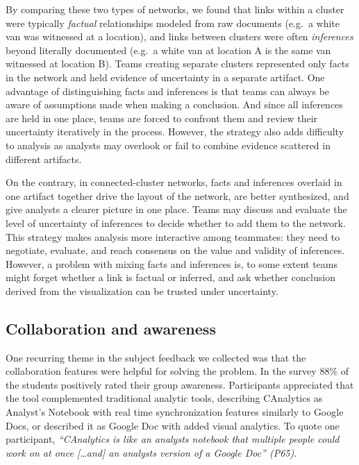 By comparing these two types of networks, we found that links within a cluster were typically
\emph{factual} relationships modeled from raw documents (e.g.~a white van was
witnessed at a location), and links between clusters were often
\emph{inferences} beyond literally documented (e.g.~a white van at location A
is the same van witnessed at location B). Teams creating separate
clusters represented only facts in the network and held evidence of
uncertainty in a separate artifact. One advantage of distinguishing
facts and inferences is that teams can always be aware of assumptions made when
making a conclusion. And since all inferences are held in one place,
teams are forced to confront them and review their uncertainty
iteratively in the process. However, the strategy also adds difficulty
to analysis as analysts may overlook or fail to combine evidence
scattered in different artifacts.




On the contrary, in connected-cluster networks, facts and inferences overlaid in one artifact together drive the layout of the
network, are better synthesized, and give analysts a clearer picture in one place. Teams may discuss and evaluate the level of uncertainty of inferences to decide whether to add them to the
network. This strategy makes analysis more interactive among teammates:
they need to negotiate, evaluate, and reach consensus on the value and
validity of inferences. However, a problem with mixing facts and inferences is, to some extent teams might forget whether a
link is factual or inferred, and ask whether conclusion derived
from the visualization can be trusted under uncertainty.

\subsection{Collaboration and
awareness}\label{collaboration-and-awareness}


One recurring theme in the subject feedback we collected was that the
collaboration features were helpful for solving the problem. In the survey 
88\% of the students positively rated their
group awareness. Participants appreciated that the tool complemented
traditional analytic tools, describing CAnalytics as Analyst's Notebook with real time
synchronization features similarly to Google Docs, or described it as Google Doc with added visual analytics. To quote one participant,
\emph{``CAnalytics is like an analysts notebook that multiple people
could work on at once {[}\ldots{}and{]} an analysts version of a Google
Doc'' (P65)}. 

